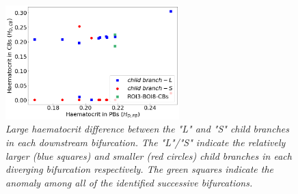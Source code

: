 \begin{table}[H]
\centering
\caption{\textit{Full evaluation of the deviations between simulation data and the empirical predictions from Pries Phase Separation Model. The "L"/"S" indicate the relatively larger and smaller child branches in each diverging bifurcation respectively.}
\label{ErrorsPSM}}
\end{table}

\begin{figure}[H]
\centering
\includegraphics[width=0.6\textwidth]{images/DownstreamBifurcationHD.png}
\caption{\textit{Large haematocrit difference between the "L" and "S" child branches in each downstream bifurcation. The "L"/"S" indicate the relatively larger (blue squares) and smaller (red circles) child branches in each diverging bifurcation respectively. The green squares indicate the anomaly among all of the identified successive bifurcations.} \label{DownstreamBifurcationHD}}
\end{figure}

